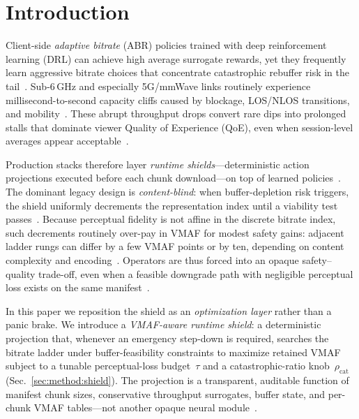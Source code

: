 \documentclass[preprint,12pt,times]{elsarticle}
\begin{document}
\section{Introduction}
\label{sec:intro}

Client-side \emph{adaptive bitrate} (ABR) policies trained with deep reinforcement learning (DRL) can achieve high average surrogate rewards, yet they frequently learn aggressive bitrate choices that concentrate catastrophic rebuffer risk in the tail~\cite{mao2017neural,sutton2018reinforcement}.
Sub-6\,GHz and especially 5G/mmWave links routinely experience millisecond-to-second capacity cliffs caused by blockage, LOS/NLOS transitions, and mobility~\cite{meng2024mmwave,cisco2023}.
These abrupt throughput drops convert rare dips into prolonged stalls that dominate viewer Quality of Experience (QoE), even when session-level averages appear acceptable~\cite{wu2024qoe,yan2019learning}.

Production stacks therefore layer \emph{runtime shields}---deterministic action projections executed before each chunk download---on top of learned policies~\cite{alshiekh2018shielding}.
The dominant legacy design is \emph{content-blind}: when buffer-depletion risk triggers, the shield uniformly decrements the representation index until a viability test passes~\cite{alshiekh2018shielding,mao2017neural}.
Because perceptual fidelity is not affine in the discrete bitrate index, such decrements routinely over-pay in VMAF for modest safety gains: adjacent ladder rungs can differ by a few VMAF points or by ten, depending on content complexity and encoding~\cite{li2016vmaf}.
Operators are thus forced into an opaque safety--quality trade-off, even when a feasible downgrade path with negligible perceptual loss exists on the same manifest~\cite{xiao2025qoe,tian2022towards}.

In this paper we reposition the shield as an \emph{optimization layer} rather than a panic brake.
We introduce a \emph{VMAF-aware runtime shield}: a deterministic projection that, whenever an emergency step-down is required, searches the bitrate ladder under buffer-feasibility constraints to maximize retained VMAF subject to a tunable perceptual-loss budget~$\tau$ and a catastrophic-ratio knob~$\rho_{\mathrm{cat}}$ (Sec.~\ref{sec:method:shield}).
The projection is a transparent, auditable function of manifest chunk sizes, conservative throughput surrogates, buffer state, and per-chunk VMAF tables---not another opaque neural module~\cite{alshiekh2018shielding,li2016vmaf}.
\end{document}
